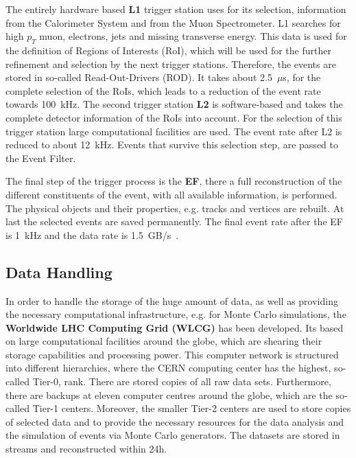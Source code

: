  The entirely hardware based \textbf{L1} trigger station uses for its selection, information from the Calorimeter System and from the Muon Spectrometer. L1 searches for high $p_T$ muon, electrons, jets and missing transverse energy. This data is used for the definition of Regions of Interests (RoI), which will be used for the further refinement and selection by the next trigger stations. Therefore, the events are stored in so-called Read-Out-Drivers (ROD). It takes about 2.5~$\mu$s, for the complete selection of the RoIs, which leads to a reduction of the event rate towards 100~kHz. The second trigger station \textbf{L2} is software-based and takes the complete detector information of the RoIs into account. For the selection of this trigger station large computational facilities are used. The event rate after L2 is reduced to about 12~kHz. 
Events that survive this selection step, are passed to the Event Filter.

 The final step of the trigger process is the \textbf{EF}, there a full reconstruction of the different constituents of the event, with all available information, is performed. The physical objects and their properties, e.g.  tracks and vertices are rebuilt. At last the selected events are saved permanently. The final event rate after the EF is 1~kHz and the data rate is 1.5~GB/s~\cite{Nakahama:2015211}.






\subsection{Data Handling}

 In order to handle the storage of the huge amount of data, as well as providing the necessary computational infrastructure, e.g. for Monte Carlo simulations, the\textbf{ Worldwide LHC Computing Grid (WLCG)} has been developed. Its based on large computational facilities around the globe, which are shearing their storage capabilities and processing power. This computer network is structured into different hierarchies, where the CERN computing center has the highest, so-called  Tier-0,  rank. There are stored copies of all raw data sets. Furthermore, there are backups at eleven computer centres around the globe, which are the so-called Tier-1 centers. Moreover,  the smaller Tier-2 centers are used to store copies of selected data and to provide the necessary resources for the data analysis and the simulation of events via Monte Carlo generators. The datasets are stored in streams and reconstructed within 24h.


